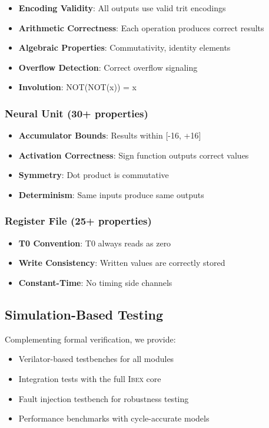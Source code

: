 \documentclass[conference,10pt]{IEEEtran}
\newcommand{\ibex}{\textsc{Ibex}}
\begin{document}
\begin{itemize}
    \item \textbf{Encoding Validity}: All outputs use valid trit encodings
    \item \textbf{Arithmetic Correctness}: Each operation produces correct results
    \item \textbf{Algebraic Properties}: Commutativity, identity elements
    \item \textbf{Overflow Detection}: Correct overflow signaling
    \item \textbf{Involution}: NOT(NOT(x)) = x
\end{itemize}

\subsubsection{Neural Unit (30+ properties)}

\begin{itemize}
    \item \textbf{Accumulator Bounds}: Results within [-16, +16]
    \item \textbf{Activation Correctness}: Sign function outputs correct values
    \item \textbf{Symmetry}: Dot product is commutative
    \item \textbf{Determinism}: Same inputs produce same outputs
\end{itemize}

\subsubsection{Register File (25+ properties)}

\begin{itemize}
    \item \textbf{T0 Convention}: T0 always reads as zero
    \item \textbf{Write Consistency}: Written values are correctly stored
    \item \textbf{Constant-Time}: No timing side channels
\end{itemize}

\subsection{Simulation-Based Testing}

Complementing formal verification, we provide:

\begin{itemize}
    \item Verilator-based testbenches for all modules
    \item Integration tests with the full \ibex{} core
    \item Fault injection testbench for robustness testing
    \item Performance benchmarks with cycle-accurate models
\end{itemize}
\end{document}
